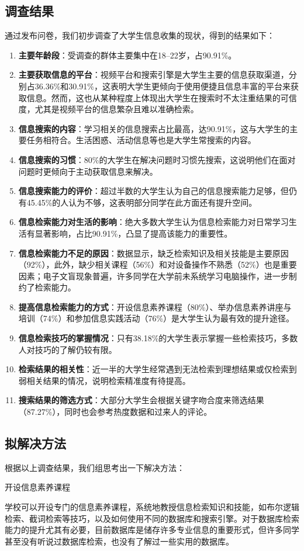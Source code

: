 \subsection{调查结果}
通过发布问卷，我们初步调查了大学生信息收集的现状，得到的结果如下：
\begin{enumerate}
    \item \textbf{主要年龄段}：受调查的群体主要集中在18–22岁，占90.91\%。
    \item \textbf{主要获取信息的平台}：视频平台和搜索引擎是大学生主要的信息获取渠道，分别占36.36\%和30.91\%，这表明大学生更倾向于使用便捷且信息丰富的平台来获取信息。然而，这也从某种程度上体现出大学生在搜索时不太注重结果的可信度，尤其是视频平台的信息繁杂且难以准确检索。
    \item \textbf{信息搜索的内容}：学习相关的信息搜索占比最高，达90.91\%，这与大学生的主要任务相符合。生活困惑、活动信息等也是大学生常搜索的内容。
    \item \textbf{信息搜索的习惯}：80\%的大学生在解决问题时习惯先搜索，这说明他们在面对问题时更倾向于主动获取信息来解决。
    \item \textbf{信息搜索能力的评价}：超过半数的大学生认为自己的信息搜索能力足够，但仍有45.45\%的人认为不够，这表明部分同学在此方面还有提升空间。
    \item \textbf{信息检索能力对生活的影响}：绝大多数大学生认为信息检索能力对日常学习生活有显著影响，占比90.91\%，凸显了提高该能力的重要性。
    \item \textbf{信息检索能力不足的原因}：数据显示，缺乏检索知识及相关技能是主要原因（92\%），此外，缺少相关课程（56\%）和对设备操作不熟悉（52\%）也是重要因素；电子文盲现象普遍，许多同学在大学前未系统学习电脑操作，进一步制约了检索能力。
    \item \textbf{提高信息检索能力的方式}：开设信息素养课程（80\%）、举办信息素养讲座与培训（74\%）和参加信息实践活动（76\%）是大学生认为最有效的提升途径。
    \item \textbf{信息检索技巧的掌握情况}：只有38.18\%的大学生表示掌握一些检索技巧，多数人对技巧的了解仍较有限。
    \item \textbf{检索结果的相关性}：近一半的大学生经常遇到无法检索到理想结果或仅检索到弱相关结果的情况，说明检索精准度有待提高。
    \item \textbf{搜索结果的筛选方式}：大部分大学生会根据关键字吻合度来筛选结果（87.27\%），同时也会参考热度数据和过来人的评论。
\end{enumerate}
\subsection{拟解决方法}
根据以上调查结果，我们组思考出一下解决方法：
\begin{ffbox}{开设信息素养课程}{}

学校可以开设专门的信息素养课程，系统地教授信息检索知识和技能，如布尔逻辑检索、截词检索等技巧，以及如何使用不同的数据库和搜索引擎。对于数据库检索能力的提升尤其有必要，目前数据库是储存许多专业信息的重要形式，但许多同学甚至没有听说过数据库检索，也没有了解过一些实用的数据库。
\end{ffbox}

